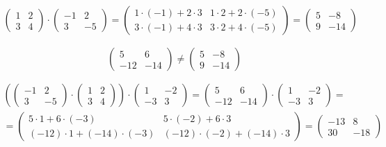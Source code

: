 \documentclass{article}
\begin{document}
\begin{gather*}
    \begin{pmatrix}
        1 & 2\\
        3 & 4
    \end{pmatrix}
    \cdot
    \begin{pmatrix}
        -1 & 2\\
        3 & -5
    \end{pmatrix}
    =
    \begin{pmatrix}
        1 \cdot (-1) + 2 \cdot 3 & 1 \cdot 2 + 2 \cdot (-5)\\
        3 \cdot (-1) + 4 \cdot 3 & 3 \cdot 2 + 4 \cdot (-5)
    \end{pmatrix}
    =
    \begin{pmatrix}
        5 & -8\\
        9 & -14
    \end{pmatrix}
\end{gather*}
    
\begin{equation*}
    \begin{pmatrix}
        5 & 6\\
        -12 & -14
    \end{pmatrix}
    \ne
    \begin{pmatrix}
        5 & -8\\
        9 & -14
    \end{pmatrix}
\end{equation*}

\begin{gather*}
    \left(
        \begin{pmatrix}
            -1 & 2\\
            3 & -5
        \end{pmatrix}
        \cdot
        \begin{pmatrix}
            1 & 2\\
            3 & 4
        \end{pmatrix}
    \right)
    \cdot
    \begin{pmatrix}
        1 & -2\\
        -3 & 3
    \end{pmatrix}
    =
    \begin{pmatrix}
        5 & 6\\
        -12 & -14
    \end{pmatrix}
    \cdot
    \begin{pmatrix}
        1 & -2\\
        -3 & 3
    \end{pmatrix}
    =
    \\
    =
    \begin{pmatrix}
        5 \cdot 1 + 6 \cdot (-3) & 5 \cdot (-2) + 6 \cdot 3\\
        (-12) \cdot 1 + (-14) \cdot (-3) & (-12) \cdot (-2) + (-14) \cdot 3
    \end{pmatrix}
    =
    \begin{pmatrix}
        -13 & 8\\
        30 & -18
    \end{pmatrix}
\end{gather*}
\end{document}
